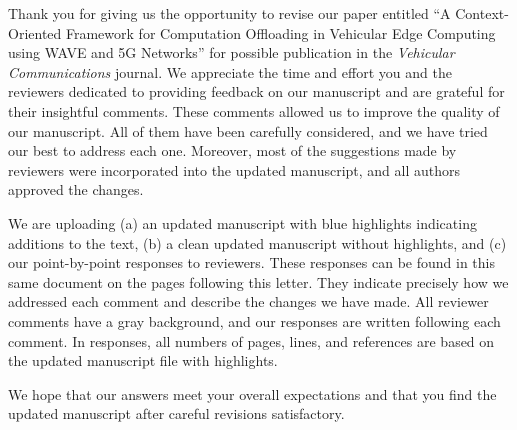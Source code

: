 Thank you for giving us the opportunity to revise our paper entitled “A Context-Oriented Framework for Computation Offloading in Vehicular Edge Computing using WAVE and 5G Networks” for possible publication in the \textit{Vehicular Communications} journal. We appreciate the time and effort you and the reviewers dedicated to providing feedback on our manuscript and are grateful for their insightful comments. These comments allowed us to improve the quality of our manuscript. All of them have been carefully considered, and we have tried our best to address each one. Moreover, most of the suggestions made by reviewers were incorporated into the updated manuscript, and all authors approved the changes.

We are uploading (a) an updated manuscript with blue highlights indicating additions to the text, (b) a clean updated manuscript without highlights, and (c) our point-by-point responses to reviewers. These responses can be found in this same document on the pages following this letter. They indicate precisely how we addressed each comment and describe the changes we have made. All reviewer comments have a gray background, and our responses are written following each comment. In responses, all numbers of pages, lines, and references are based on the updated manuscript file with highlights.

We hope that our answers meet your overall expectations and that you find the updated manuscript after careful revisions satisfactory.